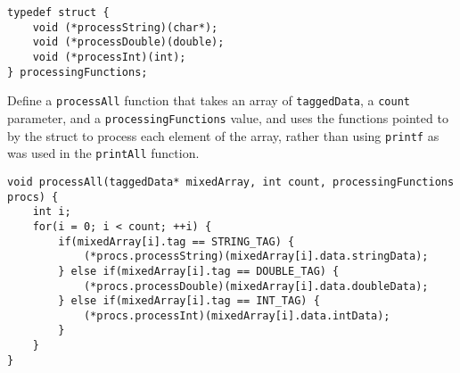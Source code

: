 \begin{enumerate}
\begin{verbatim}
typedef struct {
    void (*processString)(char*);
    void (*processDouble)(double);
    void (*processInt)(int);
} processingFunctions;
\end{verbatim}

Define a \texttt{processAll} function that takes an array of \texttt{taggedData}, a \texttt{count} parameter, and a \texttt{processingFunctions} value, and uses the functions pointed to by the struct to process each element of the array, rather than using \texttt{printf} as was used in the \texttt{printAll} function.

\begin{answer}
\begin{verbatim}
void processAll(taggedData* mixedArray, int count, processingFunctions procs) {
    int i;
    for(i = 0; i < count; ++i) {
        if(mixedArray[i].tag == STRING_TAG) {
            (*procs.processString)(mixedArray[i].data.stringData);
        } else if(mixedArray[i].tag == DOUBLE_TAG) {
            (*procs.processDouble)(mixedArray[i].data.doubleData);
        } else if(mixedArray[i].tag == INT_TAG) {
            (*procs.processInt)(mixedArray[i].data.intData);
        }
    }
}
\end{verbatim}
\end{answer}
\end{enumerate}

